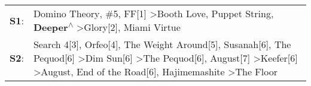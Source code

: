 \begin{supertabular}{p{0.03\textwidth}p{0.92\textwidth}}
 \textbf{S1}:  &                                                                                                                                                                                                                                                     Domino Theory\textsuperscript{}, \enspace \#5\textsuperscript{}, \enspace FF[1]\textsuperscript{} \textgreater \enspace Booth Love\textsuperscript{}, \enspace Puppet String\textsuperscript{}, \enspace \textbf{Deeper\textsuperscript{$\wedge$}} \textgreater \enspace Glory[2]\textsuperscript{}, \enspace Miami Virtue\textsuperscript{}  \enspace  \\
 \textbf{S2}:  &  Search 4[3]\textsuperscript{}, \enspace Orfeo[4]\textsuperscript{}, \enspace The Weight Around[5]\textsuperscript{}, \enspace Susanah[6]\textsuperscript{}, \enspace The Pequod[6]\textsuperscript{} \textgreater \enspace Dim Sun[6]\textsuperscript{} \textgreater \enspace The Pequod[6]\textsuperscript{}, \enspace August[7]\textsuperscript{} \textgreater \enspace Keefer[6]\textsuperscript{} \textgreater \enspace August\textsuperscript{}, \enspace End of the Road[6]\textsuperscript{}, \enspace Hajimemashite\textsuperscript{} \textgreater \enspace The Floor\textsuperscript{}  \enspace  \\
\end{supertabular}
